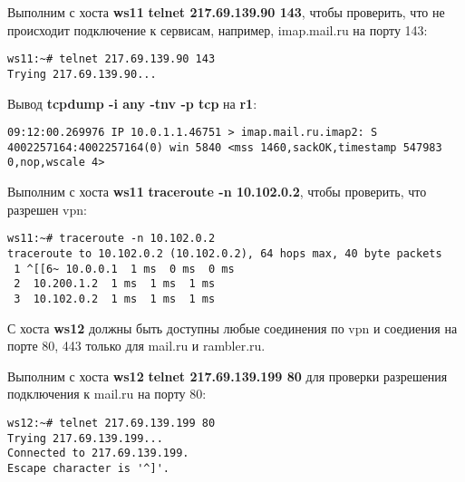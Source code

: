 \documentclass[a4paper,12pt]{article}
\begin{document}
Выполним с хоста \textbf{ws11} \textbf{telnet 217.69.139.90 143},  чтобы проверить,
что не происходит подключение к сервисам, например, imap.mail.ru на порту 143:
\begin{Verbatim}
ws11:~# telnet 217.69.139.90 143
Trying 217.69.139.90...
\end{Verbatim}

Вывод \textbf{tcpdump -i any -tnv -p tcp} на \textbf{r1}:
\begin{Verbatim}
09:12:00.269976 IP 10.0.1.1.46751 > imap.mail.ru.imap2: S 4002257164:4002257164(0) win 5840 <mss 1460,sackOK,timestamp 547983 0,nop,wscale 4>
\end{Verbatim}

Выполним с хоста \textbf{ws11} \textbf{traceroute -n 10.102.0.2},  чтобы проверить,
что разрешен vpn:
\begin{Verbatim}
ws11:~# traceroute -n 10.102.0.2
traceroute to 10.102.0.2 (10.102.0.2), 64 hops max, 40 byte packets
 1 ^[[6~ 10.0.0.1  1 ms  0 ms  0 ms
 2  10.200.1.2  1 ms  1 ms  1 ms
 3  10.102.0.2  1 ms  1 ms  1 ms
\end{Verbatim}


С хоста \textbf{ws12} должны быть доступны любые соединения по vpn и
соедиения на порте 80, 443 только для mail.ru и rambler.ru. 

Выполним с хоста \textbf{ws12} \textbf{telnet 217.69.139.199 80} для проверки
разрешения подключения к mail.ru на порту 80:
\begin{Verbatim}
ws12:~# telnet 217.69.139.199 80
Trying 217.69.139.199...
Connected to 217.69.139.199.
Escape character is '^]'.
\end{Verbatim}
\end{document}
